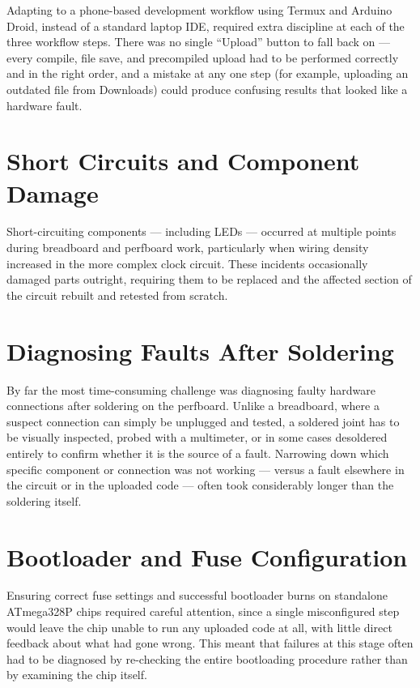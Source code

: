 \documentclass[12pt,a4paper]{report}
\begin{document}
Adapting to a phone-based development workflow using Termux and Arduino Droid, instead of a standard laptop IDE, required extra discipline at each of the three workflow steps. There was no single ``Upload'' button to fall back on --- every compile, file save, and precompiled upload had to be performed correctly and in the right order, and a mistake at any one step (for example, uploading an outdated file from Downloads) could produce confusing results that looked like a hardware fault.

\section{Short Circuits and Component Damage}
\label{sec:shorts}

Short-circuiting components --- including LEDs --- occurred at multiple points during breadboard and perfboard work, particularly when wiring density increased in the more complex clock circuit. These incidents occasionally damaged parts outright, requiring them to be replaced and the affected section of the circuit rebuilt and retested from scratch.

\section{Diagnosing Faults After Soldering}
\label{sec:diagnose}

By far the most time-consuming challenge was diagnosing faulty hardware connections after soldering on the perfboard. Unlike a breadboard, where a suspect connection can simply be unplugged and tested, a soldered joint has to be visually inspected, probed with a multimeter, or in some cases desoldered entirely to confirm whether it is the source of a fault. Narrowing down which specific component or connection was not working --- versus a fault elsewhere in the circuit or in the uploaded code --- often took considerably longer than the soldering itself.

\section{Bootloader and Fuse Configuration}
\label{sec:fuse}

Ensuring correct fuse settings and successful bootloader burns on standalone ATmega328P chips required careful attention, since a single misconfigured step would leave the chip unable to run any uploaded code at all, with little direct feedback about what had gone wrong. This meant that failures at this stage often had to be diagnosed by re-checking the entire bootloading procedure rather than by examining the chip itself.
\end{document}
